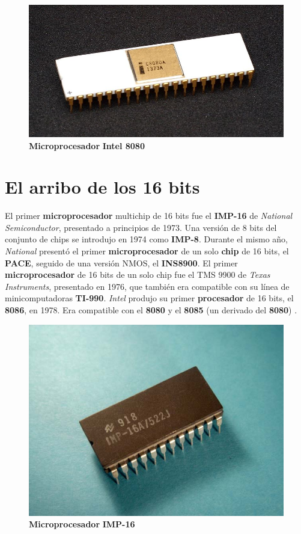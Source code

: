 \begin{figure}[htb]
	\centering
	\includegraphics[scale = 0.2]{Graphics/8080_microprocessorr.jpg}
	\caption{\textbf{Microprocesador} \textbf{Intel 8080}}
	\label{fig:14}
\end{figure}

\section{El arribo de los 16 bits}
El primer \textbf{microprocesador} multichip de 16 bits fue el \textbf{IMP-16} de \emph{National Semiconductor}, presentado a principios de
1973. Una versión de 8 bits del conjunto de chips se introdujo en 1974 como \textbf{IMP-8}. Durante el mismo año, \emph{National} presentó
el primer \textbf{microprocesador} de un solo \textbf{chip} de 16 bits, el \textbf{PACE}, seguido de una versión NMOS, el \textbf{INS8900}.
El primer \textbf{microprocesador} de 16 bits de un solo chip fue el TMS 9900 de \emph{Texas Instruments}, presentado en 1976, que también
era compatible con su línea de minicomputadoras \textbf{TI-990}. \emph{Intel} produjo su primer \textbf{procesador} de 16 bits, el \textbf{8086},
en 1978. Era compatible con el \textbf{8080} y el \textbf{8085} (un derivado del \textbf{8080}) .

\begin{figure}[htb]
	\centering
	\includegraphics[scale = 0.2]{Graphics/NSIMP-16A.jpg}
	\caption{\textbf{Microprocesador} \textbf{IMP-16}}
	\label{fig:15}
\end{figure}


